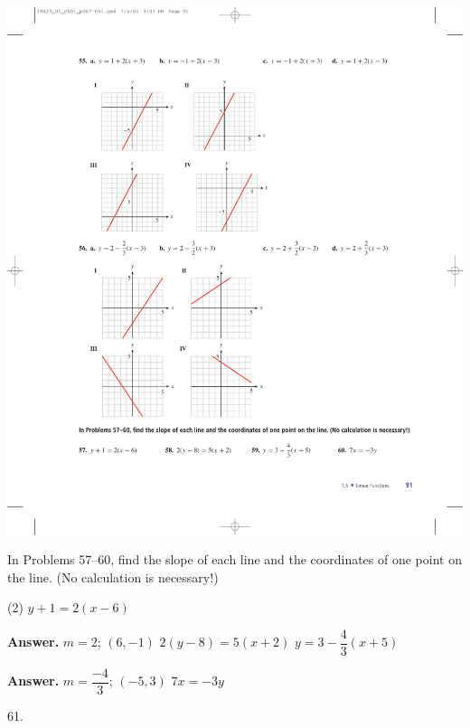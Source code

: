\documentclass[10pt,]{book}
\theoremstyle{plain}
\theoremstyle{definition}
\theoremstyle{definition}
\theoremstyle{definition}
\theoremstyle{definition}
\numberwithin{equation}{part}
\begin{document}
\begin{exerciselist}
\begin{exercisegroup}
\begin{multicols}{2}
\end{multicols}
 \includegraphics[width=0.9\linewidth]{images/fig-ex-1-5-56}
%
\end{exercisegroup}
\par\smallskip\noindent
\hypertarget{exercisegroup-45}{}\par\noindent In Problems 57–60, find the slope of each line and the coordinates of one point on the line. (No calculation is necessary!)%
\begin{exercisegroup}(2)
\exercise[57.]\hypertarget{exercise-343}{}\(y + 1 = 2(x - 6)\)%
\par\smallskip
\noindent\textbf{Answer.}\hypertarget{answer-192}{}\quad
\(m = 2\); \((6,-1)\)%
\exercise[58.]\hypertarget{exercise-344}{}\(2(y - 8) = 5(x + 2)\)%
\exercise[59.]\hypertarget{exercise-345}{}\(y = 3 - \dfrac{4}{3}(x + 5)\)%
\par\smallskip
\noindent\textbf{Answer.}\hypertarget{answer-193}{}\quad
\(m =\dfrac{-4}{3} \); \((-5, 3)\)%
\exercise[60.]\hypertarget{exercise-346}{}\(7x = -3y\)%
\end{exercisegroup}
\par\smallskip\noindent
\item[61.]\hypertarget{exercise-347}{}\leavevmode%
\begin{enumerate}[label=*\alph**]

\end{enumerate}
\end{exerciselist}
\end{document}

